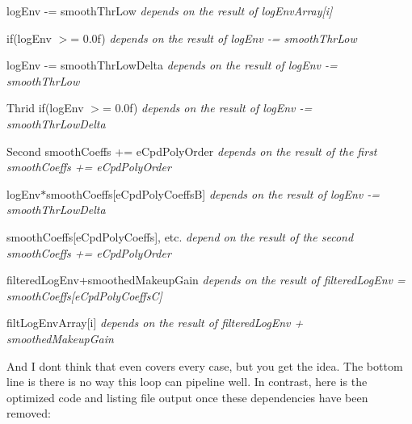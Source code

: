 \begin{DoxyItemize}
\item {\ttfamily log\+Env -\/= smooth\+Thr\+Low }  {\itshape  depends on the result of {\ttfamily log\+Env\+Array\mbox{[}i\mbox{]}}} {\ttfamily }  


\item {\ttfamily if(log\+Env $>$= 0.\+0f) }  {\itshape  depends on the result of {\ttfamily log\+Env -\/= smooth\+Thr\+Low}} {\ttfamily }  


\item {\ttfamily log\+Env -\/= smooth\+Thr\+Low\+Delta }  {\itshape  depends on the result of {\ttfamily log\+Env -\/= smooth\+Thr\+Low}} {\ttfamily }  


\item {\ttfamily Thrid if(log\+Env $>$= 0.\+0f) }  {\itshape  depends on the result of {\ttfamily log\+Env -\/= smooth\+Thr\+Low\+Delta}} {\ttfamily }  


\item {\ttfamily Second smooth\+Coeffs += e\+Cpd\+Poly\+Order }  {\itshape  depends on the result of the first {\ttfamily smooth\+Coeffs += e\+Cpd\+Poly\+Order}} {\ttfamily }  


\item {\ttfamily log\+Env$\ast$smooth\+Coeffs\mbox{[}e\+Cpd\+Poly\+CoeffsB\mbox{]} }  {\itshape  depends on the result of {\ttfamily log\+Env -\/= smooth\+Thr\+Low\+Delta}} {\ttfamily }  


\item {\ttfamily smooth\+Coeffs\mbox{[}e\+Cpd\+Poly\+Coeffs\mbox{]}, etc. }  {\itshape  depend on the result of the second {\ttfamily smooth\+Coeffs += e\+Cpd\+Poly\+Order}} {\ttfamily }  


\item {\ttfamily filtered\+Log\+Env+smoothed\+Makeup\+Gain }  {\itshape  depends on the result of {\ttfamily filtered\+Log\+Env = smooth\+Coeffs\mbox{[}e\+Cpd\+Poly\+CoeffsC\mbox{]}}}  


\item {\ttfamily filt\+Log\+Env\+Array\mbox{[}i\mbox{]} }  {\itshape  depends on the result of {\ttfamily filtered\+Log\+Env + smoothed\+Makeup\+Gain}}  


\end{DoxyItemize}

And I don\textquotesingle{}t think that even covers every case, but you get the idea. The bottom line is there is no way this loop can pipeline well. In contrast, here is the optimized code and listing file output once these dependencies have been removed\+:


